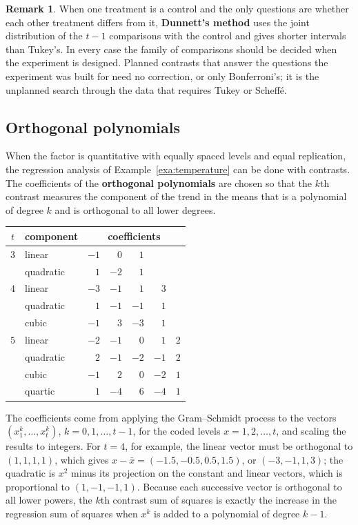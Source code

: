 \documentclass[11pt,a4paper]{article}
\numberwithin{equation}{section}
\theoremstyle{definition}
\newtheorem*{remark}{Remark}
\begin{document}
\begin{remark}
When one treatment is a control and the only questions are whether each other treatment differs from it, \textbf{Dunnett's method} uses the joint
distribution of the $t - 1$ comparisons with the control and gives shorter intervals than Tukey's. In every case the family of comparisons should
be decided when the experiment is designed. Planned contrasts that answer the questions the experiment was built for need no correction, or
only Bonferroni's; it is the unplanned search through the data that requires Tukey or Scheff\'e.
\end{remark}

\subsection{Orthogonal polynomials}
When the factor is quantitative with equally spaced levels and equal replication, the regression analysis of Example~\ref{exa:temperature} can be done with
contrasts. The coefficients of the \textbf{orthogonal polynomials} are chosen so that the $k$th contrast measures the component of the trend in the
means that is a polynomial of degree $k$ and is orthogonal to all lower degrees.

\begin{center}
\begin{tabular}{c|l|rrrrr}
$t$ & component & \multicolumn{5}{c}{coefficients} \\
\hline
$3$ & linear & $-1$ & $0$ & $1$ & & \\
 & quadratic & $1$ & $-2$ & $1$ & & \\
\hline
$4$ & linear & $-3$ & $-1$ & $1$ & $3$ & \\
 & quadratic & $1$ & $-1$ & $-1$ & $1$ & \\
 & cubic & $-1$ & $3$ & $-3$ & $1$ & \\
\hline
$5$ & linear & $-2$ & $-1$ & $0$ & $1$ & $2$ \\
 & quadratic & $2$ & $-1$ & $-2$ & $-1$ & $2$ \\
 & cubic & $-1$ & $2$ & $0$ & $-2$ & $1$ \\
 & quartic & $1$ & $-4$ & $6$ & $-4$ & $1$
\end{tabular}
\end{center}

The coefficients come from applying the Gram--Schmidt process to the vectors $(x_1^k, \dots, x_t^k)$, $k = 0, 1, \dots, t - 1$, for the coded levels
$x = 1, 2, \dots, t$, and scaling the results to integers. For $t = 4$, for example, the linear vector must be orthogonal to $(1, 1, 1, 1)$, which gives
$x - \bar x = (-1.5, -0.5, 0.5, 1.5)$, or $(-3, -1, 1, 3)$; the quadratic is $x^2$ minus its projection on the constant and linear vectors, which is proportional to
$(1, -1, -1, 1)$. Because each successive vector is orthogonal to all lower powers, the $k$th contrast sum of squares is exactly the increase in the
regression sum of squares when $x^k$ is added to a polynomial of degree $k - 1$.
\end{document}
